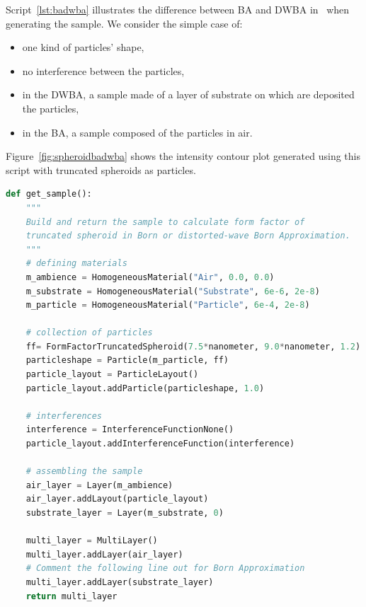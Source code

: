 Script~\ref{lst:badwba} illustrates the difference between BA and DWBA in \BornAgain\ when generating the sample.  We consider the simple case of:
\begin{itemize}
\item one kind of particles' shape,
\item no interference between the particles,
\item in the DWBA, a sample made of a layer of substrate on which are deposited the particles,
\item in the BA, a sample composed of the particles in air.
\end{itemize}

Figure~\ref{fig:spheroidbadwba} shows the intensity contour plot generated using this script with truncated spheroids as particles.

\newpage

\begin{lstlisting}[language=python, style=eclipseboxed,numbers=none,nolol,caption={\Code{Python} script to generate a sample using Born (BA) or distorted-wave Born approximation (DWBA). The difference between BA and DWBA in this simple case is the absence or presence of a substrate layer in the sample.},label={lst:badwba}]
def get_sample():
    """
    Build and return the sample to calculate form factor of
    truncated spheroid in Born or distorted-wave Born Approximation.
    """
    # defining materials
    m_ambience = HomogeneousMaterial("Air", 0.0, 0.0)
    m_substrate = HomogeneousMaterial("Substrate", 6e-6, 2e-8)
    m_particle = HomogeneousMaterial("Particle", 6e-4, 2e-8)

    # collection of particles
    ff= FormFactorTruncatedSpheroid(7.5*nanometer, 9.0*nanometer, 1.2)
    particleshape = Particle(m_particle, ff)
    particle_layout = ParticleLayout()
    particle_layout.addParticle(particleshape, 1.0)

    # interferences
    interference = InterferenceFunctionNone()
    particle_layout.addInterferenceFunction(interference)

    # assembling the sample
    air_layer = Layer(m_ambience)
    air_layer.addLayout(particle_layout)
    substrate_layer = Layer(m_substrate, 0)

    multi_layer = MultiLayer()
    multi_layer.addLayer(air_layer)
    # Comment the following line out for Born Approximation
    multi_layer.addLayer(substrate_layer)
    return multi_layer
\end{lstlisting}


